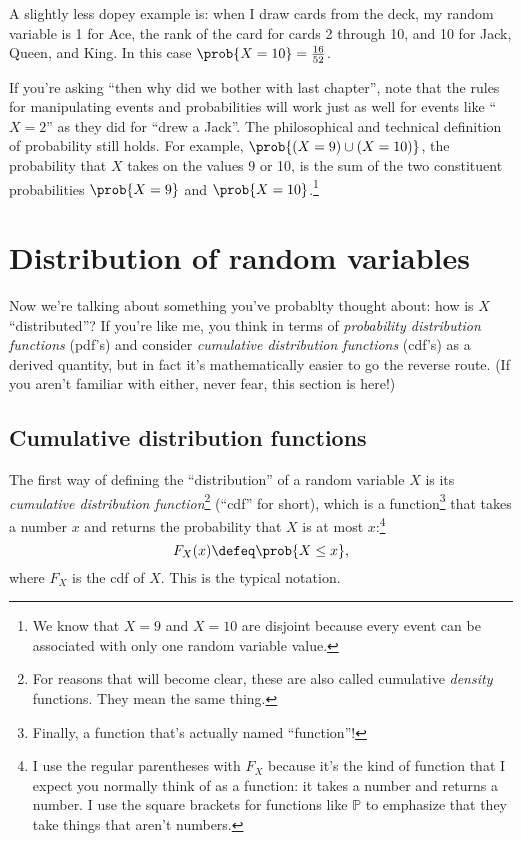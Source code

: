 A slightly less dopey example is: when I draw cards from the deck, my random
variable is 1 for Ace, the rank of the card for cards 2 through 10, and 10 for
Jack, Queen, and King. In this case $\prob{X = 10} = \tfrac{16}{52}$.

If you're asking ``then why did we bother with last chapter'', note that the
rules for manipulating events and probabilities will work just as well for
events like ``$X = 2$'' as they did for ``drew a Jack''. The philosophical and
technical definition of probability still holds. For example, $\prob{(X = 9)
\cup (X = 10)}$, the probability that $X$ takes on the values 9 or 10, is the
sum of the two constituent probabilities $\prob{X=9}$ and
$\prob{X=10}$.\footnote{We know that $X=9$ and $X=10$ are disjoint because
every event can be associated with only one random variable value.}

\section{Distribution of random variables}

Now we're talking about something you've probablty thought about: how is $X$
``distributed''? If you're like me, you think in terms of \emph{probability
distribution functions} (pdf's) and consider \emph{cumulative distribution
functions} (cdf's) as a derived quantity, but in fact it's mathematically
easier to go the reverse route. (If you aren't familiar with either, never
fear, this section is here!)

\subsection{Cumulative distribution functions}

The first way of defining the ``distribution'' of a random variable $X$ is its
\emph{cumulative distribution function}\footnote{For reasons that will become
clear, these are also called cumulative \emph{density} functions. They mean
the same thing.} (``cdf'' for short), which is a function\footnote{Finally, a
function that's actually named ``function''!} that takes a number $x$ and
returns the probability that $X$ is at most $x$:\footnote{I use the regular
parentheses with $F_X$ because it's the kind of function that I expect you
normally think of as a function: it takes a number and returns a number. I use
the square brackets for functions like $\mathbb{P}$ to emphasize that they
take things that aren't numbers.}
$$
F_X(x) \defeq \prob{X \leq x},
$$
where $F_X$ is the cdf of $X$. This is the typical notation.

